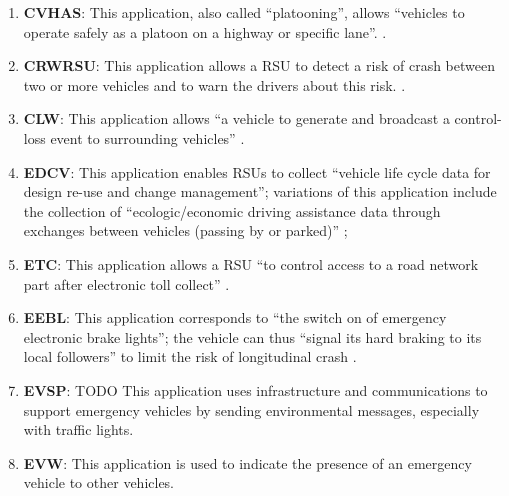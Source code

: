 \begin{enumerate}
\item \textbf{\acrfull{CVHAS}}: This application, also called ``platooning'', allows ``vehicles to operate safely as a platoon on a highway or specific lane''. \cite{etsi_etsi_tr_102_638_intelligent_2009,brown_review_2019}.
\item \textbf{\acrfull{CRWRSU}}: This application allows a \acrshort{RSU} to detect a risk of crash between two or more vehicles and to warn the drivers about this risk. \cite{etsi_etsi_tr_102_638_intelligent_2009,j_vehicle--vehicle_2014}.
\item \textbf{\acrfull{CLW}}: This application allows ``a vehicle to generate and broadcast a control-loss event to surrounding vehicles'' \cite{karagiannis_vehicular_2011}.
\item \textbf{\acrfull{EDCV}}: This application enables \acrshort{RSU}s to collect ``vehicle life cycle data for design re-use and change management''; variations of this application include the collection of ``ecologic/economic driving assistance data through exchanges between vehicles (passing by or parked)'' \cite{etsi_etsi_tr_102_638_intelligent_2009,papadimitratos_vehicular_2009,chang_estimated_2015};
\item \textbf{\acrfull{ETC}}: This application allows a \acrshort{RSU} ``to control access to a road network part after electronic toll collect'' \cite{etsi_etsi_tr_102_638_intelligent_2009,papadimitratos_vehicular_2009,brown_review_2019}.
\item \textbf{\acrfull{EEBL}}: This application corresponds to ``the switch on of emergency electronic brake lights''; the vehicle can thus ``signal its hard braking to its local followers'' to limit the risk of longitudinal crash \cite{etsi_etsi_tr_102_638_intelligent_2009,papadimitratos_vehicular_2009,brown_review_2019,j_vehicle--vehicle_2014,hamida_security_2015,boban_use_2017,etsi_tr_102_863_intelligent_2011,al-sultan_comprehensive_2014,miucic_v2x_2018,karagiannis_vehicular_2011,xu_dsrc_2017,zeadally_tutorial_2020,noauthor_intelligent_nodate}.
\item \textbf{\acrfull{EVSP}}: TODO This application uses infrastructure and communications to support emergency vehicles by sending environmental messages, especially with traffic lights. \cite{al-sultan_comprehensive_2014}
\item \textbf{\acrfull{EVW}}: This application is used to indicate the presence of an emergency vehicle to other vehicles. \cite{etsi_etsi_tr_102_638_intelligent_2009,raza_social_2018,al-sultan_comprehensive_2014,karagiannis_vehicular_2011,buchenscheit_vanet-based_2009}

\end{enumerate}

